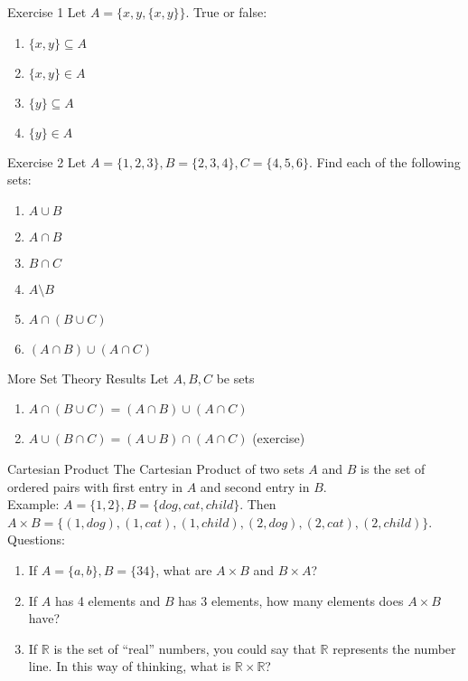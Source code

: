 \documentclass{beamer}
\begin{document}
\begin{frame}{Exercise 1}
Let $A = \{x,y,\{x,y\}\}$. True or false:
\begin{enumerate}
\item $\{x,y\}\subseteq A$
\item $\{x,y\}\in A$
\item $\{y\}\subseteq A$
\item $\{y\}\in A$
\end{enumerate}
\end{frame}

\begin{frame}{Exercise 2}
Let $A = \{1,2,3\}, B = \{2,3,4\}, C = \{4,5,6\}$. Find each of the following sets:
\begin{enumerate}
\item $A\cup B$
\item $A\cap B$
\item $B\cap C$
\item $A\setminus B$
\item $A\cap (B\cup C)$
\item $(A\cap B)\cup (A\cap C)$
\end{enumerate}
\end{frame}

\begin{frame}{More Set Theory Results}
Let $A,B,C$ be sets
\begin{enumerate}
\item $A\cap (B\cup C) = (A\cap B)\cup (A\cap C)$
\item $A\cup (B\cap C) = (A\cup B)\cap (A\cap C)$ (exercise)
\end{enumerate}
\end{frame}

\begin{frame}{Cartesian Product}
The Cartesian Product of two sets $A$ and $B$ is the set of ordered pairs with first entry in $A$ and second entry in $B$.
\\\vspace{10pt}
Example: $A = \{1,2\}, B = \{dog, cat, child\}$. Then $A\times B = \{(1,dog), (1,cat), (1,child), (2,dog), (2,cat), (2,child)\}$.
\\\vspace{10pt}
Questions:
\begin{enumerate}
\item If $A = \{a,b\}, B = \{34\}$, what are $A\times B$ and $B\times A$?
\item If $A$ has 4 elements and $B$ has 3 elements, how many elements does $A\times B$ have?
\item If $\mathbb{R}$ is the set of ``real'' numbers, you could say that $\mathbb{R}$ represents the number line. In this way of thinking, what is $\mathbb{R}\times\mathbb{R}$? 
\end{enumerate}
\end{frame}
\end{document}
